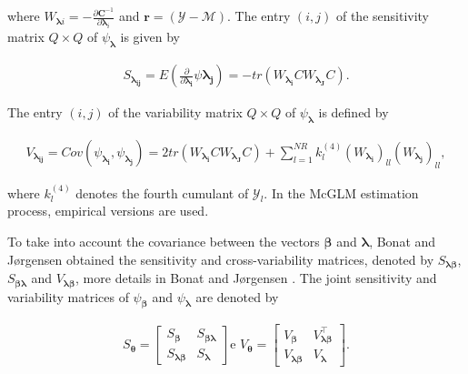 \documentclass[AMA,STIX1COL]{WileyNJD-v2}
\begin{document}
\noindent where $W_{\boldsymbol{\lambda}i} = -\frac{\partial \boldsymbol{C}^{-1}}{\partial \boldsymbol{\lambda}_i}$ and $\boldsymbol{ r} = (\mathcal{Y} - \mathcal{M})$. The entry $(i,j)$ of the sensitivity matrix $Q \times Q$ of $\psi_{\boldsymbol{\lambda}}$ is given by

$$
  \begin{aligned}
    S_{\boldsymbol{\lambda_{ij}}} = E \left (\frac{\partial }{\partial \boldsymbol{\lambda_{i}}} \psi \boldsymbol{\lambda_{j}}\right) = -tr(W_{\boldsymbol{\lambda_{i}}} CW_{\boldsymbol{\lambda_{J}}} C).
  \end{aligned}
$$

\noindent The entry $(i,j)$ of the variability matrix $Q \times Q$ of $\psi_{\boldsymbol{\lambda}}$ is defined by

$$
  \begin{aligned}
V_{\boldsymbol{\lambda_{ij}}} = Cov\left ( \psi_{\boldsymbol{\lambda_{i}}}, \psi_{\boldsymbol{\lambda_{j}}} \right) = 2tr(W_{\boldsymbol{\lambda_{i}}} CW_{\boldsymbol{\lambda_{J}}} C) + \sum_{l=1}^{NR} k_{l}^{(4)} (W_{\boldsymbol{\lambda_{i}}})_{ll} (W_{\boldsymbol{\lambda_{j}}})_{ll},
  \end{aligned}
$$

\noindent where $k_{l}^{(4)}$ denotes the fourth cumulant of $\mathcal{Y}_{l}$. In the McGLM estimation process, empirical versions are used.

To take into account the covariance between the vectors $\boldsymbol{\beta}$ and $\boldsymbol{\lambda}$, Bonat and Jørgensen \cite{Bonat16} obtained the sensitivity and cross-variability matrices, denoted by $S_{\boldsymbol{ \lambda \beta}}$, $S_{\boldsymbol{\beta \lambda}}$ and $V_{\boldsymbol{\lambda \beta}}$, more details in Bonat and Jørgensen \cite{Bonat16}. The joint sensitivity and variability matrices of $\psi_{\boldsymbol{\beta}}$ and $\psi_{\boldsymbol{\lambda}}$ are denoted by

$$
  \begin{aligned}
    S_{\boldsymbol{\theta}} = \begin{bmatrix}
      S_{\boldsymbol{\beta}} & S_{\boldsymbol{\beta\lambda}} \\ 
      S_{\boldsymbol{\lambda\beta}} & S_{\boldsymbol{\lambda}} 
      \end{bmatrix} \text{e } V_{\boldsymbol{\theta}} = \begin{bmatrix}
      V_{\boldsymbol{\beta}} & V^{\top}_{\boldsymbol{\lambda\beta}} \\ 
      V_{\boldsymbol{\lambda\beta}} & V_{\boldsymbol{\lambda}} 
    \end{bmatrix}.
  \end{aligned}
$$
\end{document}
